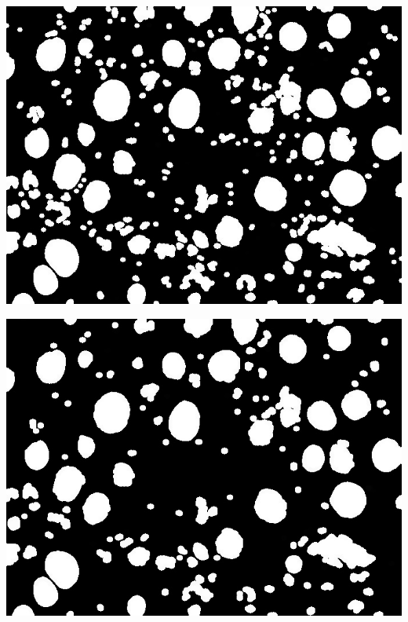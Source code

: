 \documentclass[a4paper]{article}
\begin{document}
\begin{minipage}{0.24\textwidth}
    \centering
    \includegraphics[width=\textwidth]{../code/task1/output/kernel_size_9.jpg}
\end{minipage}
\hfill
\begin{minipage}{0.24\textwidth}
    \centering
    \includegraphics[width=\textwidth]{../code/task1/output/kernel_size_11.jpg}
\end{minipage}
\hfill
\end{document}
